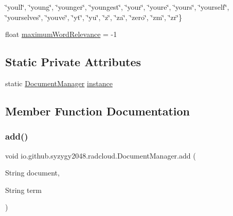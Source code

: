 \begin{DoxyCompactItemize}
$$\char`\"{}youll\char`\"{}, \char`\"{}young\char`\"{}, \char`\"{}younger\char`\"{}, \char`\"{}youngest\char`\"{}, \char`\"{}your\char`\"{}, \char`\"{}youre\char`\"{}, \char`\"{}yours\char`\"{}, \char`\"{}yourself\char`\"{}, \char`\"{}yourselves\char`\"{}, \char`\"{}youve\char`\"{}, \char`\"{}yt\char`\"{}, \char`\"{}yu\char`\"{}, \char`\"{}z\char`\"{}, \char`\"{}za\char`\"{}, \char`\"{}zero\char`\"{}, \char`\"{}zm\char`\"{}, \char`\"{}zr\char`\"{}\}
\item 
float \mbox{\hyperlink{classio_1_1github_1_1syzygy2048_1_1radcloud_1_1_document_manager_aa916c7fc8adbcf354f6de176ce956d9b}{maximum\+Word\+Relevance}} = -\/1
\end{DoxyCompactItemize}
\subsection*{Static Private Attributes}
\begin{DoxyCompactItemize}
\item 
static \mbox{\hyperlink{classio_1_1github_1_1syzygy2048_1_1radcloud_1_1_document_manager}{Document\+Manager}} \mbox{\hyperlink{classio_1_1github_1_1syzygy2048_1_1radcloud_1_1_document_manager_abf666eb397787cf4d1fae50844f920a9}{instance}}
\end{DoxyCompactItemize}


\subsection{Member Function Documentation}
\mbox{\label{classio_1_1github_1_1syzygy2048_1_1radcloud_1_1_document_manager_aecdf1d11ec1b9a2db9cdb0f60b1c1184}} 
\subsubsection{\texorpdfstring{add()}{add()}}
{\footnotesize\ttfamily void io.\+github.\+syzygy2048.\+radcloud.\+Document\+Manager.\+add (\begin{DoxyParamCaption}\item[{String}]{document,  }\item[{String}]{term }\end{DoxyParamCaption})\hspace{0.3cm}{\ttfamily [private]}}


